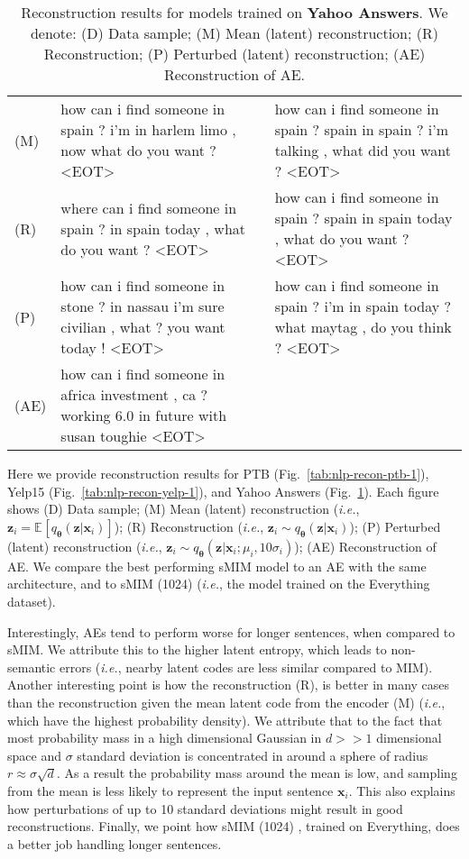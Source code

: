 \documentclass{article}
\newcommand{\bs}{\boldsymbol}
\newcommand{\ie}{{\em i.e.}}
\newcommand{\x}{{\bs{x}}}
\newcommand{\z}{{\bs z}}
\newcommand{\params}{{\bs \theta}}
\newcommand{\penc}{q}
\newcommand{\Menc}{\penc_{\params}}
\newcommand{\E}[2]{\mathbb{E}_{#1}\left[#2\right]}
\begin{document}
\begin{table}[th]
{\begin{tabular}{l| p{8cm}|p{8cm} }
        \hline 
\hdashline[1pt/1pt]
(M) & how can i find someone in spain ? i'm in harlem limo , now what do you want ? \textsc{<EOT>} & how can i find someone in spain ? spain in spain ? i'm talking , what did you want ? \textsc{<EOT>} \\
\hdashline[1pt/1pt]
(R) & where can i find someone in spain ? in spain today , what do you want ? \textsc{<EOT>} & how can i find someone in spain ? spain in spain today , what do you want ? \textsc{<EOT>} \\
\hdashline[1pt/1pt]
(P) & how can i find someone in stone ? in nassau i'm sure civilian , what ? you want today ! \textsc{<EOT>} & how can i find someone in spain ? i'm in spain today ? what maytag , do you think ? \textsc{<EOT>} \\
\hdashline[1pt/1pt]
(AE) & how can i find someone in africa investment , ca ? working 6.0 in future with susan toughie \textsc{<EOT>} &  \\
    \end{tabular}
    }
    \caption{
    Reconstruction results for models trained on \textbf{Yahoo Answers}.
    We denote:
    (D) Data sample; 
    (M) Mean (latent) reconstruction;
    (R) Reconstruction;
    (P) Perturbed (latent) reconstruction;
    (AE) Reconstruction of AE.
    }
    \label{tab:nlp-recon-yahoo-1}
\end{table}


Here we provide reconstruction results for PTB (Fig.\ \ref{tab:nlp-recon-ptb-1}),
Yelp15 (Fig.\ \ref{tab:nlp-recon-yelp-1}), and Yahoo Answers (Fig.\ \ref{tab:nlp-recon-yahoo-1}).
Each figure shows (D) Data sample; 
(M) Mean (latent) reconstruction (\ie, $\z_i = \E{}{\Menc(\z|\x_i)}$);
(R) Reconstruction (\ie, $\z_i \sim \Menc(\z|\x_i)$);
(P) Perturbed (latent) reconstruction (\ie, $\z_i \sim \Menc(\z|\x_i;\mu_i, 10\sigma_i)$);
(AE) Reconstruction of AE.
We compare the best performing sMIM model to an AE with the same architecture, and to sMIM (1024) \textsuperscript{\textdagger}
(\ie, the model trained on the Everything dataset). 

Interestingly, AEs tend to perform worse for longer sentences, when compared to sMIM.
We attribute this to the higher latent entropy, which leads to non-semantic errors 
(\ie, nearby latent codes are less similar compared to MIM).
Another interesting point is how the reconstruction (R), is better in many cases than 
the reconstruction given the mean latent code from the encoder (M) (\ie, which have the highest probability density).
We attribute that to the fact that most probability mass in a high dimensional Gaussian in $d >> 1$ dimensional space and $\sigma$ standard deviation is concentrated in around a sphere of radius $r \approx \sigma \sqrt{d}$. 
As a result the probability mass around the mean is low, and sampling from the mean is less likely to represent the input sentence $\x_i$.
This also explains how perturbations of up to 10 standard deviations might result in good reconstructions.
Finally, we point how sMIM (1024) \textsuperscript{\textdagger}, trained on Everything, does a better job handling longer sentences.
\end{document}
